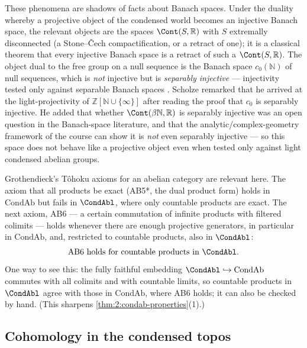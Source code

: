 \begin{remark}
\label{rmk:3:banach}
These phenomena are shadows of facts about Banach spaces. Under the duality
whereby a projective object of the condensed world becomes an injective Banach
space, the relevant objects are the spaces $\Cont(S,\mathbb{R})$ with $S$
extremally disconnected (a Stone--\v{C}ech compactification, or a retract of
one); it is a classical theorem that every injective Banach space is a retract of
such a $\Cont(S,\mathbb{R})$. The object dual to the free group on a null
sequence is the Banach space $c_0(\mathbb{N})$ of null sequences, which is
\emph{not} injective but is \emph{separably injective} --- injectivity tested
only against separable Banach spaces \cite{Avil_s_2016}. Scholze remarked that he
arrived at the light-projectivity of $\mathbb{Z}[\mathbb{N}\cup\{\infty\}]$ after
reading the proof that $c_0$ is separably injective. He added that
whether $\Cont(\beta\mathbb{N},\mathbb{R})$ is separably injective was an open
question in the Banach-space literature, and that the analytic/complex-geometry
framework of the course can show it is \emph{not} even separably injective --- so
this space does not behave like a projective object even when tested only against
light condensed abelian groups.
\end{remark}

\begin{remark}[AB axioms]
\label{rmk:3:ab-axioms}
Grothendieck's T\^ohoku axioms for an abelian category are relevant here. The
axiom that all products be exact (AB5*, the dual product form) holds in
$\mathrm{CondAb}$ but fails in $\CondAbl$, where only countable products are
exact. The next axiom, AB6 --- a certain commutation of infinite products with
filtered colimits --- holds whenever there are enough projective generators, in
particular in $\mathrm{CondAb}$, and, restricted to countable products, also in
$\CondAbl$:
\begin{equation*}
\text{AB6 holds for countable products in }\CondAbl.
\end{equation*}
One way to see this: the fully faithful embedding
$\CondAbl\hookrightarrow\mathrm{CondAb}$ commutes with all colimits and with
countable limits, so countable products in $\CondAbl$ agree with those in
$\mathrm{CondAb}$, where AB6 holds; it can also be checked by hand. (This
sharpens \cref{thm:2:condab-properties}(1).)
\end{remark}

\subsection{Cohomology in the condensed topos}

